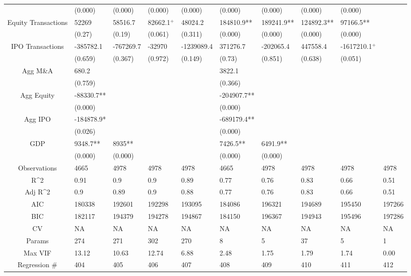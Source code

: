 \documentclass{article}
\begin{document}
\begin{table}[H]
\begin{tabular}{|clllllllll|}
   & (0.000) & (0.000) & (0.000) & (0.000) & (0.000) & (0.000) & (0.000) & (0.000) &  \\ 
  Equity Transactions & 52269 & 58516.7 & 82662.1$^{+}$ & 48024.2 & 184810.9** & 189241.9** & 124892.3** & 97166.5** &  \\ 
   & (0.27) & (0.19) & (0.061) & (0.311) & (0.000) & (0.000) & (0.000) & (0.000) &  \\ 
  IPO Transactions & -385782.1 & -767269.7 & -32970 & -1239089.4 & 371276.7 & -202065.4 & 447558.4 & -1617210.1$^{+}$ &  \\ 
   & (0.659) & (0.367) & (0.972) & (0.149) & (0.73) & (0.851) & (0.638) & (0.051) &  \\ 
  Agg M\&A & 680.2 &  &  &  & 3822.1 &  &  &  &  \\ 
   & (0.759) &  &  &  & (0.366) &  &  &  &  \\ 
  Agg Equity & -88330.7** &  &  &  & -204907.7** &  &  &  &  \\ 
   & (0.000) &  &  &  & (0.000) &  &  &  &  \\ 
  Agg IPO & -184878.9* &  &  &  & -689179.4** &  &  &  &  \\ 
   & (0.026) &  &  &  & (0.000) &  &  &  &  \\ 
  GDP & 9348.7** & 8935** &  &  & 7426.5** & 6491.9** &  &  &  \\ 
   & (0.000) & (0.000) &  &  & (0.000) & (0.000) &  &  &  \\ 
  \hline 
 Observations & 4665 & 4978 & 4978 & 4978 & 4665 & 4978 & 4978 & 4978 & 4978 \\ 
  R^2 & 0.91 & 0.9 & 0.9 & 0.89 & 0.77 & 0.76 & 0.83 & 0.66 & 0.51 \\ 
  Adj R^2 & 0.9 & 0.89 & 0.9 & 0.88 & 0.77 & 0.76 & 0.83 & 0.66 & 0.51 \\ 
  AIC & 180338 & 192601 & 192298 & 193095 & 184086 & 196321 & 194689 & 195450 & 197266 \\ 
  BIC & 182117 & 194379 & 194278 & 194867 & 184150 & 196367 & 194943 & 195496 & 197286 \\ 
  CV & NA & NA & NA & NA & NA & NA & NA & NA & NA \\ 
  Params & 274 & 271 & 302 & 270 & 8 & 5 & 37 & 5 & 1 \\ 
  Max VIF & 13.12 & 10.63 & 12.74 & 6.88 & 2.48 & 1.75 & 1.79 & 1.74 & 0.00 \\ 
  Regression \# & 404 & 405 & 406 & 407 & 408 & 409 & 410 & 411 & 412 \\ 
   \hline
\end{tabular}
 
\end{table}
\end{document}
